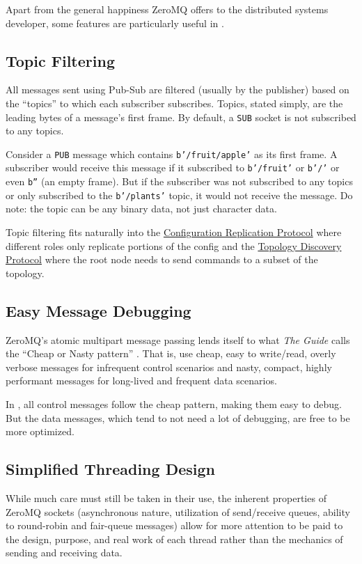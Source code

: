 Apart from the general happiness ZeroMQ offers to the distributed systems developer, some features are particularly
useful in \dcamp.

\subsection{Topic Filtering}

All messages sent using Pub-Sub are filtered (usually by the publisher) based on the ``topics'' to which each subscriber
subscribes. Topics, stated simply, are the leading bytes of a message's first frame. By default, a \texttt{SUB} socket
is not subscribed to any topics.

Consider a \texttt{PUB} message which contains \texttt{b'/fruit/apple'} as its first frame. A subscriber would receive
this message if it subscribed to \texttt{b'/fruit'} or \texttt{b'/'} or even \texttt{b''} (an empty frame). But if the
subscriber was not subscribed to any topics or only subscribed to the \texttt{b'/plants'} topic, it would not receive
the message. Do note: the topic can be any binary data, not just character data.

Topic filtering fits naturally into the \hyperref[proto_config]{Configuration Replication Protocol} where different
roles only replicate portions of the config and the \hyperref[proto_topo]{Topology Discovery Protocol} where the root
node needs to send commands to a subset of the topology.

\subsection{Easy Message Debugging}

ZeroMQ's atomic multipart message passing lends itself to what \textit{The Guide} calls the ``Cheap or Nasty pattern''
\cite{zguide}. That is, use cheap, easy to write/read, overly verbose messages for infrequent control scenarios and
nasty, compact, highly performant messages for long-lived and frequent data scenarios.

In \dcamp, all control messages follow the cheap pattern, making them easy to debug. But the data messages, which tend
to not need a lot of debugging, are free to be more optimized.

\subsection{Simplified Threading Design}

While much care must still be taken in their use, the inherent properties of ZeroMQ sockets (asynchronous nature,
utilization of send/receive queues, ability to round-robin and fair-queue messages) allow for more attention to be paid
to the design, purpose, and real work of each thread rather than the mechanics of sending and receiving data.

